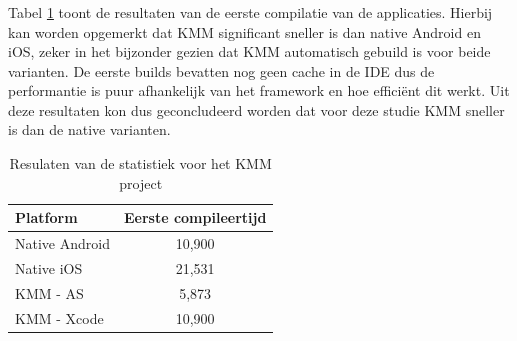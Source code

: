 \subsubsection{}
\label{sec:M-test-1-comp}
Tabel \ref{T:1e-compile} toont de resultaten van de eerste compilatie van de applicaties. Hierbij kan worden opgemerkt dat KMM significant sneller is dan native Android en iOS, zeker in het bijzonder gezien dat KMM automatisch gebuild is voor beide varianten. De eerste builds bevatten nog geen cache in de IDE dus de performantie is puur afhankelijk van het framework en hoe efficiënt dit werkt. Uit deze resultaten kon dus geconcludeerd worden dat voor deze studie KMM sneller is dan de native varianten.

\begin{table}[H]
    \centering
    \caption{Resulaten van de statistiek voor het KMM project}
    \begin{tabular}{|l|c|}
        \hline
        {\textbf{Platform}} & {\textbf{Eerste compileertijd}} \\ \hline \hline
        Native Android&10,900\\ \hline
        Native iOS&21,531\\ \hline
        KMM - AS&5,873\\ \hline
        KMM - Xcode &10,900\\ \hline
    \end{tabular}
    \label{T:1e-compile}
\end{table}



\subsubsection{}
\label{sec:M-test-andere-comp}


